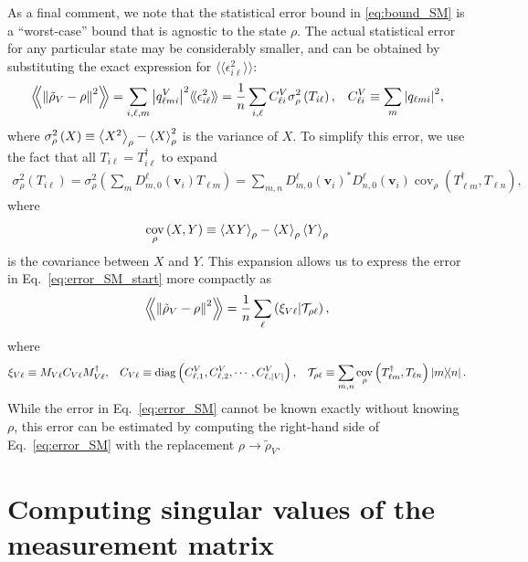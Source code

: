 \documentclass[notitlepage,twocolumn]{revtex4-2}
\newcommand{\f}[2]{\dfrac{#1}{#2}} %
\newcommand{\p}[1]{\left(#1\right)} %
\newcommand{\bk}{\Braket} %
\renewcommand{\v}{\bm} %
\newcommand{\bbk}[1]{\langle\!\langle #1 \rangle\!\rangle}
\newcommand{\Bbk}[1]
{\left\langle\!\!\left\langle #1 \right\rangle\!\!\right\rangle}
\newcommand{\T}{\mathcal{T}}
\DeclareMathOperator{\cov}{cov}
\DeclareMathOperator{\diag}{diag}
\begin{document}
As a final comment, we note that the statistical error bound in \eqref{eq:bound_SM} is a ``worst-case'' bound that is agnostic to the state $\rho$.
The actual statistical error for any particular state may be considerably smaller, and can be obtained by substituting the exact expression for $\bbk{\epsilon_{i\ell}^2}$:
\begin{align}
  \Bbk{\norm{\tilde\rho_V-\rho}^2}
  = \sum_{i,\ell,m} \abs{q^V_{\ell mi}}^2 \bbk{\epsilon_{i\ell}^2}
  = \f1n \sum_{i,\ell} C^V_{\ell i} \sigma_\rho^2\p{T_{i\ell}},
  &&
  C^V_{\ell i} \equiv \sum_m \abs{q_{\ell mi}}^2,
  \label{eq:error_SM_start}
\end{align}
where $\sigma_\rho^2\p{X}\equiv\bk{X^2}_\rho - \bk{X}_\rho^2$ is the variance of $X$.
To simplify this error, we use the fact that all $T_{i\ell}=T_{i\ell}^\dag$ to expand
\begin{align}
  \sigma_\rho^2\p{T_{i\ell}}
  = \sigma_\rho^2\p{\sum_m D^\ell_{m,0}\p{\v v_i} T_{\ell m}}
  = \sum_{m,n} D^\ell_{m,0}\p{\v v_i}^* D^\ell_{n,0}\p{\v v_i}
  \cov_\rho\p{T_{\ell m}^\dag, T_{\ell n}},
\end{align}
where
\begin{align}
  \cov_\rho\p{X,Y} \equiv \bk{X Y}_\rho - \bk{X}_\rho \bk{Y}_\rho
\end{align}
is the covariance between $X$ and $Y$.
This expansion allows us to express the error in Eq.~\eqref{eq:error_SM_start} more compactly as
\begin{align}
  \Bbk{\norm{\tilde\rho_V-\rho}^2}
  = \f1n \sum_\ell \p{\xi_{V\ell}|\T_{\rho\ell}},
  \label{eq:error_SM}
\end{align}
where
\begin{align}
  \xi_{V\ell} \equiv M_{V\ell} C_{V\ell} M_{V\ell}^\dag,
  &&
  C_{V\ell}
  \equiv \diag\p{C^V_{\ell,1},C^V_{\ell,2},\cdots,C^V_{\ell,\abs{V}}},
  &&
  \T_{\rho\ell}
  \equiv \sum_{m,n} \cov_\rho\p{T_{\ell m}^\dag, T_{\ell n}} \op{m}{n}.
\end{align}
While the error in Eq.~\eqref{eq:error_SM} cannot be known exactly without knowing $\rho$, this error can be estimated by computing the right-hand side of Eq.~\eqref{eq:error_SM} with the replacement $\rho\to\tilde\rho_V$.

\section{Computing singular values of the measurement matrix}
\label{sec:compute}
\end{document}
